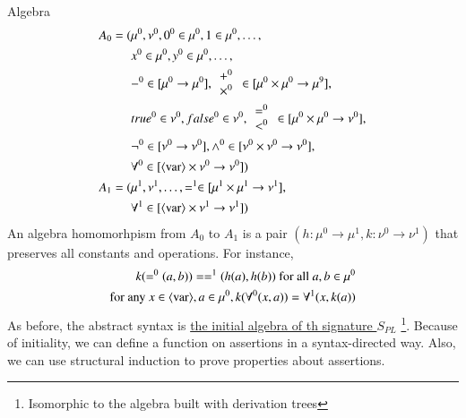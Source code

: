 \documentclass{article}[12pt]
\begin{document}
Algebra
\begin{align*}
    A_0 = (&\mu^0, \nu^0, 0^0 \in \mu^0, 1 \in \mu^0, \ldots,  \\
    &x^0 \in \mu^0, y^0 \in \mu^0, \ldots, \\
    &-^0\in [\mu^0 \rightarrow \mu^0], \begin{array}{c}+^0 \\ \times^0 \end{array} \in [\mu^0 \times \mu^0 \rightarrow \mu^9], \\
    &true^0 \in \nu^0, false^0 \in \nu^0, \begin{array}{c} =^0 \\ <^0 \end{array} \in [\mu^0 \times \mu^0 \rightarrow \nu^0], \\
    &\neg^0 \in [\nu^0 \rightarrow \nu^0], \wedge^0 \in [\nu^0 \times \nu^0 \rightarrow \nu^0], \\
    &\forall^0 \in [\langle \text{var}\rangle \times \nu^0 \rightarrow \nu^0]) \\
    A_1 = (&\mu^1, \nu^1, \ldots, =^1 \in [\mu^1 \times \mu^1 \rightarrow \nu^1], \\
    &\forall^1\in [\langle \text{var}\rangle \times \nu^1 \rightarrow \nu^1])
\end{align*}
An algebra homomorhpism from $A_0$ to $A_1$ is a pair $(h:\mu^0\rightarrow \mu^1, k:\nu^0\rightarrow\nu^1)$ that preserves all constants and operations. For instance,
\begin{align*}
    k(=^0 (a, b)) = =^1 (h(a), h(b)) \text{ for all }a, b\in \mu^0 \\
    \text{for any }x\in \langle \text{var}\rangle, a\in \mu^0, k(\forall^0 (x, a)) = \forall^1 (x, k(a))
\end{align*}
As before, the abstract syntax is \underline{the initial algebra of th signature $S_{PL}$} \footnote{Isomorphic to the algebra built with derivation trees}. Because of initiality, we can define a function on assertions in a syntax-directed way. Also, we can use structural induction to prove properties about assertions. \\
\end{document}
